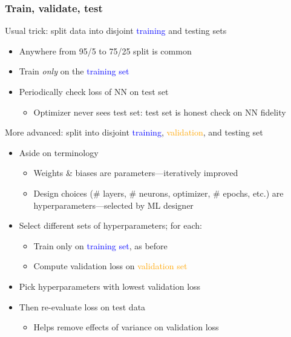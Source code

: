 \begin{frame}
    \frametitle{Train, validate, test}

    Usual trick: split data into disjoint \textcolor{blue}{training} and \textcolor{Green4}{testing} sets
    \begin{itemize}
        \item Anywhere from 95/5 to 75/25 split is common
        \item Train \emph{only} on the \textcolor{blue}{training set}
        \item Periodically check loss of NN on \textcolor{Green4}{test set}
        \begin{itemize}
            \item Optimizer never sees test set: test set is honest check on NN fidelity
        \end{itemize}
    \end{itemize}
    \pause

    More advanced: split into disjoint \textcolor{blue}{training}, \textcolor{orange}{validation}, and \textcolor{Green4}{testing} set
    \begin{itemize}
        \item Aside on terminology
        \begin{itemize}
            \item Weights \& biases are \alert{parameters}---iteratively improved
            \item Design choices (\# layers, \# neurons, optimizer, \# epochs, etc.) are \alert{hyperparameters}---selected by ML designer
        \end{itemize}
        \item Select different sets of hyperparameters; for each:
        \begin{itemize}
            \item Train only on \textcolor{blue}{training set}, as before
            \item Compute validation loss on \textcolor{orange}{validation set}
        \end{itemize}
        \item Pick hyperparameters with lowest validation loss
        \item Then re-evaluate loss on \textcolor{Green4}{test data}
        \begin{itemize}
            \item Helps remove effects of variance on validation loss
        \end{itemize}
    \end{itemize}
\end{frame}


